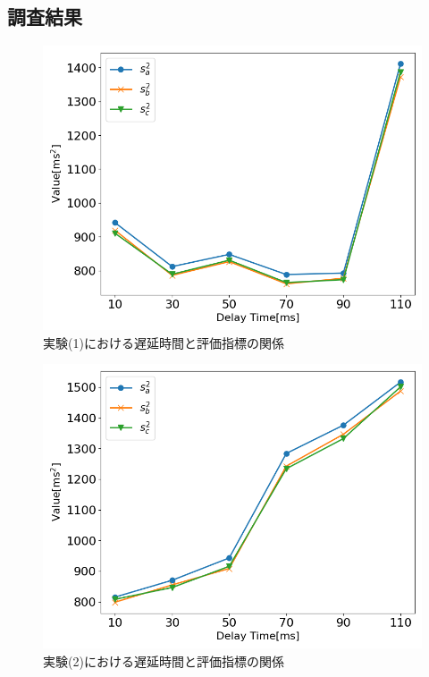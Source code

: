 \subsection{調査結果}
\begin{figure}[tbp]
  \centering
  \includegraphics[scale=0.5]{figures/Yobi/Var/Normal_bunnsann.png}
  \caption{実験(1)における遅延時間と評価指標の関係}
  \label{fig:Normal_bunsan}
\end{figure}
\begin{figure}[bt]
  \centering
  \includegraphics[scale=0.5]{figures/Yobi/Var/Unique_bunsan.png}
  \caption{実験(2)における遅延時間と評価指標の関係}
  \label{fig:Unique_bunsan}
\end{figure}
